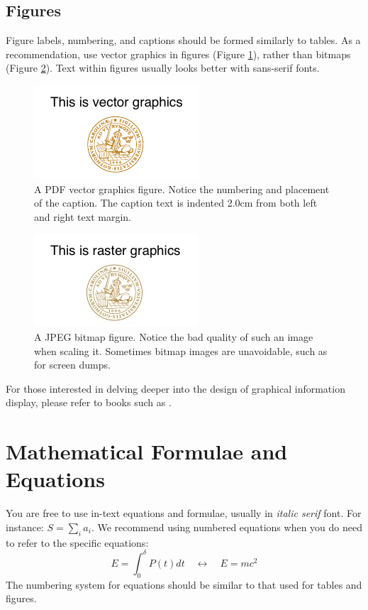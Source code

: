 \documentclass{cslthse-msc}
\begin{document}
\subsection{Figures}
Figure labels, numbering, and captions should be formed similarly to tables. As a recommendation, use vector graphics in figures (Figure \ref{fig:vectorg}), rather than bitmaps (Figure \ref{fig:rasterg}). Text within figures usually looks better with sans-serif fonts.
\begin{figure}[!hbt]
\centering
\includegraphics[scale=2.5]{images/examplepic1.pdf} 
\caption{A PDF vector graphics figure. Notice the numbering and placement of the caption. The caption text is indented 2.0cm from both left and right text margin.}\label{fig:vectorg}
\end{figure}

\begin{figure}[!hbt]
\centering
\includegraphics[scale=2.5]{images/examplepic3.jpg} 
\caption{A JPEG bitmap figure. Notice the bad quality of such an image when scaling it. Sometimes bitmap images are unavoidable, such as for screen dumps.}\label{fig:rasterg}
\end{figure}
For those interested in delving deeper into the design of graphical information display, please refer to books such as \cite{Tufte:1986, few2012show}.

\section{Mathematical Formulae and Equations}
You are free to use in-text equations and formulae, usually in \textit{italic serif} font. For instance: $S = \sum_i a_i$. We recommend using numbered equations when you do need to refer to the specific equations:
\begin{equation}
E = \int_0^{\delta} P(t) dt \quad \longleftrightarrow \quad E = m c^2
\end{equation}
The numbering system for equations should be similar to that used for tables and figures.
\end{document}
